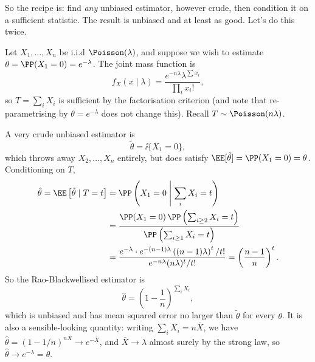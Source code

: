 So the recipe is: find \emph{any} unbiased estimator, however crude, then condition it on a sufficient statistic. The result is unbiased and at least as good. Let's do this twice.

\begin{example}
  Let $X_1, \dots, X_n$ be i.i.d $\Poisson(\lambda)$, and suppose we wish to estimate $\theta = \PP(X_1 = 0) = e^{-\lambda}$. The joint mass function is
  $$
  f_X(x \mid \lambda) = \frac{e^{-n\lambda}\lambda^{\sum x_i}}{\prod_i x_i!},
  $$
  so $T = \sum_i X_i$ is sufficient by the factorisation criterion (and note that re-parametrising by $\theta = e^{-\lambda}$ does not change this). Recall $T \sim \Poisson(n\lambda)$.

  A very crude unbiased estimator is
  $$
  \tilde\theta = \ii\{X_1 = 0\},
  $$
  which throws away $X_2, \dots, X_n$ entirely, but does satisfy $\EE[\tilde\theta] = \PP(X_1 = 0) = \theta$. Conditioning on $T$,
  \begin{align*}
    \hat\theta = \EE\left[\tilde\theta \mid T = t\right] &= \PP\left(X_1 = 0 \;\middle|\; \sum_i X_i = t\right)\\
    &= \frac{\PP(X_1 = 0)\,\PP\left(\sum_{i \geq 2}X_i = t\right)}{\PP\left(\sum_{i\geq 1}X_i = t\right)}\\
    &= \frac{e^{-\lambda}\cdot e^{-(n-1)\lambda}\left((n-1)\lambda\right)^t/t!}{e^{-n\lambda}(n\lambda)^t/t!} = \left(\frac{n-1}{n}\right)^t.
  \end{align*}
  So the Rao-Blackwellised estimator is
  $$
  \hat\theta = \left(1 - \frac{1}{n}\right)^{\sum_i X_i},
  $$
  which is unbiased and has mean squared error no larger than $\tilde\theta$ for every $\theta$. It is also a sensible-looking quantity: writing $\sum_i X_i = n\overline{X}$, we have $\hat\theta = (1 - 1/n)^{n\overline{X}} \to e^{-\overline{X}}$, and $\overline{X} \to \lambda$ almost surely by the strong law, so $\hat\theta \to e^{-\lambda} = \theta$.
\end{example}

